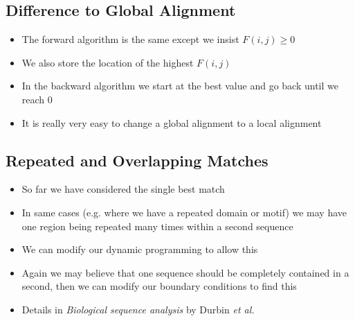 \begin{slide}
\section{Difference to Global Alignment}

\begin{PauseHighLight}
  \begin{itemize}
  \item The forward algorithm is the same except we insist
    $F(i,j)\geq0$\pause
  \item We also store the location of the highest $F(i,j)$\pause
  \item In the backward algorithm we start at the best value and go back
    until we reach 0\pause
  \item It is really very easy to change a global alignment to a local
    alignment\pause
  \end{itemize}
\end{PauseHighLight}

\end{slide}


\begin{slide}
\section{Repeated and Overlapping Matches}

\begin{PauseHighLight}
  \begin{itemize}
  \item So far we have considered the single best match\pause
  \item In same cases (e.g. where we have a repeated domain or motif) we
    may have one region being repeated many times within a second
    sequence\pause
  \item We can modify our dynamic programming to allow this\pause
  \item Again we may believe that one sequence should be completely
    contained in a second, then we can modify our boundary conditions to
    find this\pause
  \item Details in \textit{Biological sequence analysis} by Durbin
    \textit{et al.}\pause
  \end{itemize}
\end{PauseHighLight}

\end{slide}

